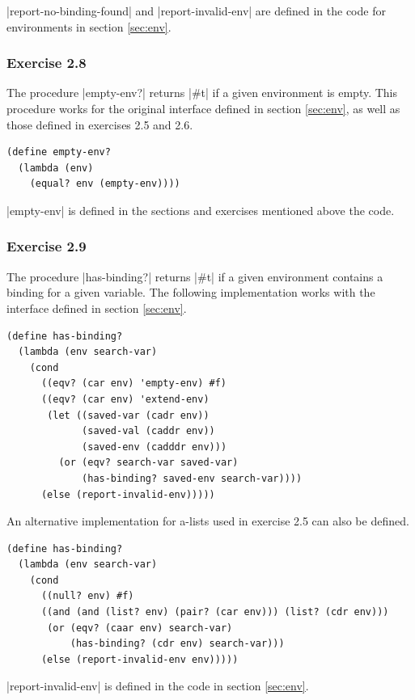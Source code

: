 \documentclass[a4paper]{article}
\begin{document}
|report-no-binding-found| and |report-invalid-env| are defined in the code for environments in section \ref{sec:env}.

\subsubsection{Exercise 2.8}

The procedure |empty-env?| returns |#t| if a given environment is empty. This procedure works for the original interface defined in section \ref{sec:env}, as well as those defined in exercises 2.5 and 2.6.

\begin{lstlisting}
(define empty-env?
  (lambda (env)
    (equal? env (empty-env))))
\end{lstlisting}

|empty-env| is defined in the sections and exercises mentioned above the code.

\subsubsection{Exercise 2.9}

The procedure |has-binding?| returns |#t| if a given environment contains a binding for a given variable. The following implementation works with the interface defined in section \ref{sec:env}.

\begin{lstlisting}
(define has-binding?
  (lambda (env search-var)
    (cond
      ((eqv? (car env) 'empty-env) #f)
      ((eqv? (car env) 'extend-env)
       (let ((saved-var (cadr env))
             (saved-val (caddr env))
             (saved-env (cadddr env)))
         (or (eqv? search-var saved-var)
             (has-binding? saved-env search-var))))
      (else (report-invalid-env)))))
\end{lstlisting}

An alternative implementation for a-lists used in exercise 2.5 can also be defined.

\begin{lstlisting}
(define has-binding?
  (lambda (env search-var)
    (cond
      ((null? env) #f)
      ((and (and (list? env) (pair? (car env))) (list? (cdr env)))
       (or (eqv? (caar env) search-var)
           (has-binding? (cdr env) search-var)))
      (else (report-invalid-env env)))))
\end{lstlisting}

|report-invalid-env| is defined in the code in section \ref{sec:env}.
\end{document}
